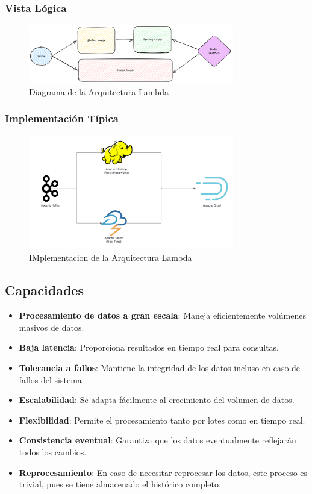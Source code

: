 \newpage
\subsubsection{Vista Lógica}
\begin{figure}[h]
\centering
\includegraphics[width=0.8\textwidth]{teorico/arquitecturas/lambda.png}
\caption{Diagrama de la Arquitectura Lambda}
\label{fig:arquitectura_lambda}
\end{figure}

\subsubsection{Implementación Típica}
\begin{figure}[h]
\centering
\includegraphics[width=0.8\textwidth]{teorico/LambdaImplement.png}
\caption{IMplementacion de la Arquitectura Lambda}
\label{fig:implementation_arquitectura_lambda}
\end{figure}

\clearpage
\newpage

\subsection{Capacidades}
\begin{itemize}
\item \textbf{Procesamiento de datos a gran escala}: Maneja eficientemente volúmenes masivos de datos.
\item \textbf{Baja latencia}: Proporciona resultados en tiempo real para consultas.
\item \textbf{Tolerancia a fallos}: Mantiene la integridad de los datos incluso en caso de fallos del sistema.
\item \textbf{Escalabilidad}: Se adapta fácilmente al crecimiento del volumen de datos.
\item \textbf{Flexibilidad}: Permite el procesamiento tanto por lotes como en tiempo real.
\item \textbf{Consistencia eventual}: Garantiza que los datos eventualmente reflejarán todos los cambios.
\item \textbf{Reprocesamiento}: En caso de necesitar reprocesar los datos, este proceso es trivial, pues se tiene almacenado el histórico completo.
\end{itemize}

